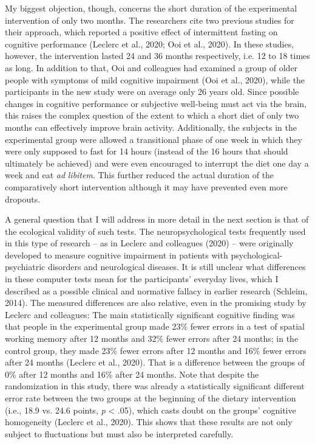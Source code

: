 \documentclass[authordate, reflection,issue]{jote-new-article}
\begin{document}
My biggest objection, though, concerns the short duration of the experimental intervention of only two months. The researchers cite two previous studies for their approach, which reported a positive effect of intermittent fasting on cognitive performance (Leclerc et al., 2020; Ooi et al., 2020). In these studies, however, the intervention lasted 24 and 36 months respectively, i.e. 12 to 18 times as long. In addition to that, Ooi and colleagues had examined a group of older people with symptoms of mild cognitive impairment (Ooi et al., 2020), while the participants in the new study were on average only 26 years old. Since possible changes in cognitive performance or subjective well-being must act via the brain, this raises the complex question of the extent to which a short diet of only two months can effectively improve brain activity. Additionally, the subjects in the experimental group were allowed a transitional phase of one week in which they were only supposed to fast for 14 hours (instead of the 16 hours that should ultimately be achieved) and were even encouraged to interrupt the diet one day a week and eat \emph{ad }\emph{libitem}. This further reduced the actual duration of the comparatively short intervention although it may have prevented even more dropouts.







A general question that I will address in more detail in the next section is that of the ecological validity of such tests. The neuropsychological tests frequently used in this type of research -- as in Leclerc and colleagues (2020) -- were originally developed to measure cognitive impairment in patients with psychological-psychiatric disorders and neurological diseases. It is still unclear what differences in these computer tests mean for the participants' everyday lives, which I described as a possible clinical and normative fallacy in earlier research (Schleim, 2014). The measured differences are also relative, even in the promising study by Leclerc and colleagues: The main statistically significant cognitive finding was that people in the experimental group made 23\% fewer errors in a test of spatial working memory after 12 months and 32\% fewer errors after 24 months; in the control group, they made 23\% fewer errors after 12 months and 16\% fewer errors after 24 months (Leclerc et al., 2020). That is a difference between the groups of 0\% after 12 months and 16\% after 24 months. Note that despite the randomization in this study, there was already a statistically significant different error rate between the two groups at the beginning of the dietary intervention (i.e., 18.9 vs. 24.6 points, \emph{p }< .05), which casts doubt on the groups' cognitive homogeneity (Leclerc et al., 2020). This shows that these results are not only subject to fluctuations but must also be interpreted carefully.
\end{document}
